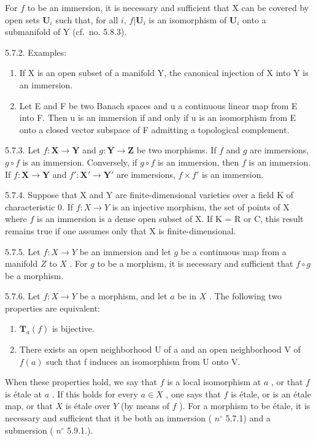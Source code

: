 For \(f\) to be an immersion, it is necessary and sufficient that X can be covered by open sets \(\mathbf{U}_{i}\) such that, for all \(i\), \(f|\mathbf{U}_{i}\) is an isomorphism of \(\mathbf{U}_{i}\) onto a submanifold of Y (cf.~no. 5.8.3).

5.7.2. Examples:

\begin{enumerate}
\def\labelenumi{(\alph{enumi})}
\item
  If X is an open subset of a manifold Y, the canonical injection of X into Y is an immersion.
\item
  Let E and F be two Banach spaces and u a continuous linear map from E into F. Then u is an immersion if and only if u is an isomorphism from E onto a closed vector subspace of F admitting a topological complement.
\end{enumerate}

5.7.3. Let \(f: \mathbf{X} \to \mathbf{Y}\) and \(g: \mathbf{Y} \to \mathbf{Z}\) be two morphisms. If \(f\) and \(g\) are immersions, \(g \circ f\) is an immersion. Conversely, if \(g \circ f\) is an immersion, then \(f\) is an immersion. If \(f: \mathbf{X} \to \mathbf{Y}\) and \(f': \mathbf{X}' \to \mathbf{Y}'\) are immersions, \(f \times f'\) is an immersion.

5.7.4. Suppose that X and Y are finite-dimensional varieties over a field K of characteristic 0. If \(f:X\to Y\) is an injective morphism, the set of points of X where \(f\) is an immersion is a dense open subset of X. If K = R or C, this result remains true if one assumes only that X is finite-dimensional.

5.7.5. Let \(f:X\to Y\) be an immersion and let \(g\) be a continuous map from a manifold \(Z\) to \(X\) . For \(g\) to be a morphism, it is necessary and sufficient that \(f\circ g\) be a morphism.

5.7.6. Let \(f: X \to Y\) be a morphism, and let \(a\) be in \(X\) . The following two properties are equivalent:

\begin{enumerate}
\def\labelenumi{(\roman{enumi})}
\item
  \(\mathbf{T}_{a}(f)\) is bijective.
\item
  There exists an open neighborhood U of a and an open neighborhood V of \(f(a)\) such that f induces an isomorphism from U onto V.
\end{enumerate}

When these properties hold, we say that \(f\) is a local isomorphism at \(a\) , or that \(f\) is étale at \(a\) . If this holds for every \(a \in X\) , one says that \(f\) is étale, or is an étale map, or that \(X\) is étale over \(Y\) (by means of \(f\) ). For a morphism to be étale, it is necessary and sufficient that it be both an immersion ( \(n^{\circ}\) 5.7.1) and a submersion ( \(n^{\circ}\) 5.9.1.).

